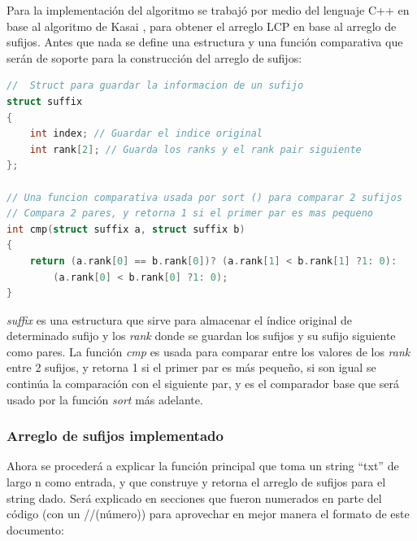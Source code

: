 Para la implementación del algoritmo se trabajó por medio del lenguaje C++ en base al algoritmo de Kasai \cite{kasaimethod}, \cite{kasai} para obtener el arreglo LCP en base al arreglo de sufijos. Antes que nada se define una estructura y una función comparativa que serán de soporte para la construcción del arreglo de sufijos:

\begin{lstlisting}[language=C++, caption=Definición previa de estructuras para construir el arreglo de sufijos]
//  Struct para guardar la informacion de un sufijo
struct suffix
{
	int index; // Guardar el indice original
	int rank[2]; // Guarda los ranks y el rank pair siguiente
};

// Una funcion comparativa usada por sort () para comparar 2 sufijos
// Compara 2 pares, y retorna 1 si el primer par es mas pequeno
int cmp(struct suffix a, struct suffix b)
{
	return (a.rank[0] == b.rank[0])? (a.rank[1] < b.rank[1] ?1: 0):
		(a.rank[0] < b.rank[0] ?1: 0);
}
\end{lstlisting}

\textit{suffix} es una estructura que sirve para almacenar el índice original de determinado sufijo y los \textit{rank} donde se guardan los sufijos y su sufijo siguiente como pares. La función \textit{cmp} es usada para comparar entre los valores de los \textit{rank} entre 2 sufijos, y retorna 1 si el primer par es más pequeño, si son igual se continúa la comparación con el siguiente par, y es el comparador base que será usado por la función \textit{sort} más adelante.

\subsubsection{Arreglo de sufijos implementado}

Ahora se procederá a explicar la función principal que toma un string ``txt'' de largo n como entrada, y que construye y retorna el arreglo de sufijos para el string dado. Será explicado en secciones que fueron numerados en parte del código (con un //(número)) para aprovechar en mejor manera el formato de este documento:

